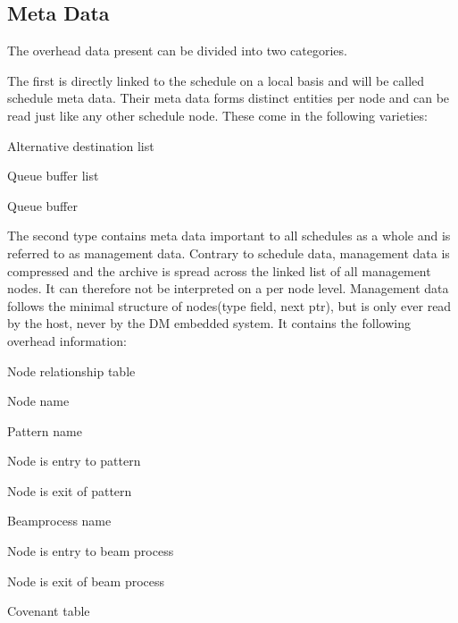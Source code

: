 \subsection{Meta Data}
The overhead data present can be divided into two categories. 
\par
The first is directly linked to the schedule on a local basis and will be called schedule meta data.
Their meta data forms distinct entities per node and can be read just like any other schedule node. 
These come in the following varieties:
%
\begin{itemize}
  \begin{item} Alternative destination list \end{item}
  \begin{item} Queue buffer list \end{item}
  \begin{item} Queue buffer \end{item}
\end{itemize}
%
\par
The second type contains meta data important to all schedules as a whole and is referred to as management data.
Contrary to schedule data, management data is compressed and the archive is spread across the linked list of all management nodes. It can therefore not be interpreted on a per node level.
Management data follows the minimal structure of nodes(type field, next ptr), but is only ever read by the host, never by the DM embedded system.
It contains the following overhead information:
%
\begin{itemize}
  \begin{item} Node relationship table \end{item}
  \begin{itemize}
    \begin{item} Node name \end{item}
    \begin{item} Pattern name \end{item}
    \begin{item} Node is entry to pattern \end{item}
    \begin{item} Node is exit of pattern \end{item}
    \begin{item} Beamprocess name\end{item}
    \begin{item} Node is entry to beam process \end{item}
    \begin{item} Node is exit of beam process \end{item}
  \end{itemize}  
  \begin{item} Covenant table \end{item}
\end{itemize}
%
